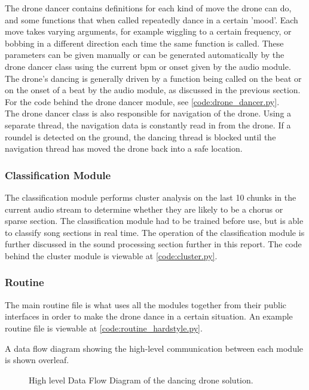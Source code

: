 The drone dancer contains definitions for each kind of move the drone can do, and some functions that when called
repeatedly dance in a certain 'mood'. Each move takes varying arguments, for example wiggling to a certain
frequency, or bobbing in a different direction each time the same function is called. These parameters can be
given manually or can be generated automatically by the drone dancer class using the current bpm or onset given by the
audio module. The drone's dancing is generally driven by a function being called on the beat or on the onset of a
beat by the audio module, as discussed in the previous section. For the code behind the drone dancer module, see
\eqref{code:drone_dancer.py}.\\

The drone dancer class is also responsible for navigation of the drone. Using a separate thread, the navigation
data is constantly read in from the drone. If a roundel is detected on the ground, the dancing thread is blocked
until the navigation thread has moved the drone back into a safe location.\\

\subsubsection{Classification Module}
The classification module performs cluster analysis on the last 10 chunks in the current audio stream to
determine whether they are likely to be a chorus or sparse section. The classification module had to be trained before
use, but is able to classify song sections in real time. The operation of the classification module is further
discussed in the sound processing section further in this report. The code behind the cluster module is viewable
at \eqref{code:cluster.py}.\\

\subsubsection{Routine}
The main routine file is what uses all the modules together from their public interfaces in order to make the
drone dance in a certain situation. An example routine file is viewable at \eqref{code:routine_hardstyle.py}.

A data flow diagram showing the high-level communication between each module is shown overleaf.

\onecolumn
\begin{figure*}[h]

\caption{High level Data Flow Diagram of the dancing drone solution.}
\end{figure*}

\begin{multicols}{2}
\twocolumn

\end{multicols}
\clearpage
